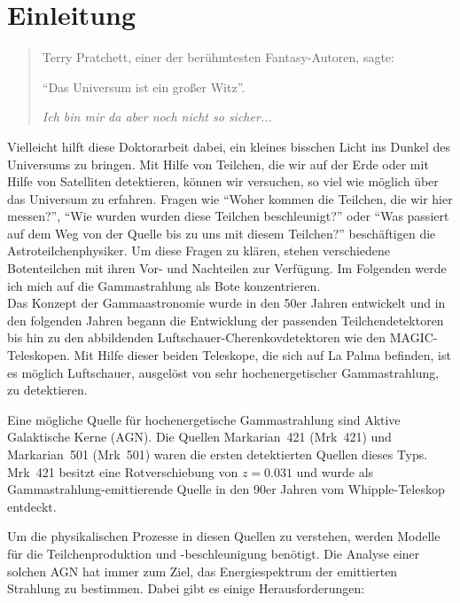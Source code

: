 \chapter{Einleitung}

\begin{quotation}
 Terry Pratchett, einer der berühmtesten Fantasy-Autoren, sagte: 
 
 \enquote{Das Universum ist ein großer Witz}.
 
 \textit{Ich bin mir da aber noch nicht so sicher...}
\end{quotation}


Vielleicht hilft diese Doktorarbeit dabei, ein kleines bisschen Licht ins Dunkel des Universums zu bringen.
Mit Hilfe von Teilchen, die wir auf der Erde oder mit Hilfe von Satelliten detektieren, können wir versuchen, so viel wie möglich über das Universum zu erfahren.
Fragen wie \enquote{Woher kommen die Teilchen, die wir hier messen?}, \enquote{Wie wurden wurden diese Teilchen beschleunigt?} oder \enquote{Was passiert auf dem Weg von der Quelle bis zu uns mit diesem Teilchen?} beschäftigen die Astroteilchenphysiker.
Um diese Fragen zu klären, stehen verschiedene Botenteilchen mit ihren Vor- und Nachteilen zur Verfügung.
Im Folgenden werde ich mich auf die Gammastrahlung als Bote konzentrieren.\\

Das Konzept der Gammaastronomie wurde in den 50er Jahren entwickelt und in den folgenden Jahren begann die Entwicklung der passenden Teilchendetektoren bis hin zu den abbildenden Luftschauer-Cherenkovdetektoren wie den MAGIC-Teleskopen.
Mit Hilfe dieser beiden Teleskope, die sich auf La Palma befinden, ist es möglich Luftschauer, ausgelöst von sehr hochenergetischer Gammastrahlung, zu detektieren.

Eine mögliche Quelle für hochenergetische Gammastrahlung sind Aktive Galaktische Kerne (AGN).
Die Quellen Markarian~421 (Mrk~421) und Markarian~501 (Mrk~501) waren die ersten detektierten Quellen dieses Typs.
Mrk~421 besitzt eine Rotverschiebung von $z=0.031$ und wurde als Gammastrahlung-emittierende Quelle in den 90er Jahren vom Whipple-Teleskop entdeckt.

Um die physikalischen Prozesse in diesen Quellen zu verstehen, werden Modelle für die Teilchenproduktion und -beschleunigung benötigt.
Die Analyse einer solchen AGN hat immer zum Ziel, das Energiespektrum der emittierten Strahlung zu bestimmen.
Dabei gibt es einige Herausforderungen:

